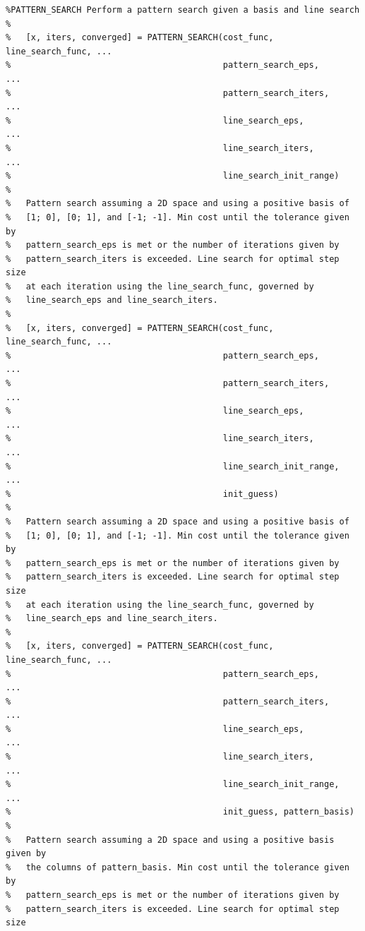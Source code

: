 \documentclass{article}
\begin{document}
\begin{lstlisting}
%PATTERN_SEARCH Perform a pattern search given a basis and line search
%
%   [x, iters, converged] = PATTERN_SEARCH(cost_func, line_search_func, ...
%                                          pattern_search_eps,          ...
%                                          pattern_search_iters,        ...
%                                          line_search_eps,             ...
%                                          line_search_iters,           ...
%                                          line_search_init_range)
%
%   Pattern search assuming a 2D space and using a positive basis of
%   [1; 0], [0; 1], and [-1; -1]. Min cost until the tolerance given by 
%   pattern_search_eps is met or the number of iterations given by
%   pattern_search_iters is exceeded. Line search for optimal step size
%   at each iteration using the line_search_func, governed by
%   line_search_eps and line_search_iters.
%
%   [x, iters, converged] = PATTERN_SEARCH(cost_func, line_search_func, ...
%                                          pattern_search_eps,          ...
%                                          pattern_search_iters,        ...
%                                          line_search_eps,             ...
%                                          line_search_iters,           ...
%                                          line_search_init_range,      ...
%                                          init_guess)
%
%   Pattern search assuming a 2D space and using a positive basis of
%   [1; 0], [0; 1], and [-1; -1]. Min cost until the tolerance given by 
%   pattern_search_eps is met or the number of iterations given by
%   pattern_search_iters is exceeded. Line search for optimal step size
%   at each iteration using the line_search_func, governed by
%   line_search_eps and line_search_iters.
%
%   [x, iters, converged] = PATTERN_SEARCH(cost_func, line_search_func, ...
%                                          pattern_search_eps,          ...
%                                          pattern_search_iters,        ...
%                                          line_search_eps,             ...
%                                          line_search_iters,           ...
%                                          line_search_init_range,      ...
%                                          init_guess, pattern_basis)
%
%   Pattern search assuming a 2D space and using a positive basis given by
%   the columns of pattern_basis. Min cost until the tolerance given by 
%   pattern_search_eps is met or the number of iterations given by
%   pattern_search_iters is exceeded. Line search for optimal step size

\end{lstlisting}
\end{document}
